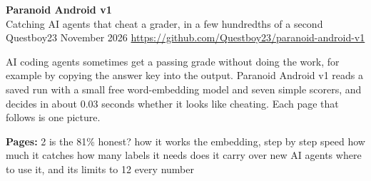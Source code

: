 \documentclass[11pt]{article}
\begin{document}
{\fontsize{34}{38}\selectfont\bfseries Paranoid Android v1}\\[3pt]
{\Large Catching AI agents that cheat a grader, in a few hundredths of a second}\\[2pt]
{\color{ink!60}Questboy23 \quad November 2026 \quad \url{https://github.com/Questboy23/paranoid-android-v1}}

\vspace{7mm}
{\large AI coding agents sometimes get a passing grade without doing the work, for example by copying the answer key into the
output. Paranoid Android v1 reads a saved run with a small free word-embedding model and seven simple scorers, and decides in
about 0.03 seconds whether it looks like cheating. Each page that follows is one picture.}

\vspace{10mm}
\begin{center}\end{center}

\vspace{12mm}
{\large\color{ink!70}\textbf{Pages:} 2 is the 81\% honest?  how it works  the embedding, step by step  speed  how much it catches  how many labels it needs  does it carry over  new AI agents  where to use it, and its limits  to 12 every number}
\end{document}
